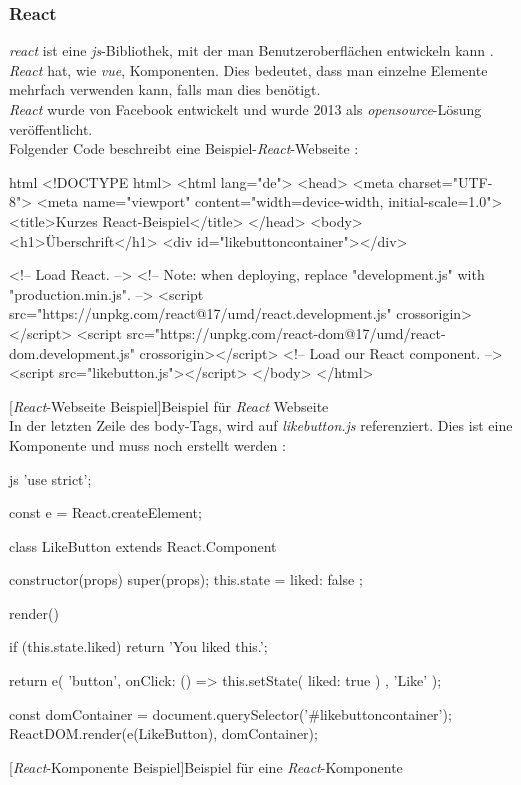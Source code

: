 \subsubsection{React}
\textit{\Gls{react}} ist eine \textit{\Gls{js}}-Bibliothek, mit der man Benutzeroberflächen entwickeln kann \cite{reactdoc}. \textit{React} hat, wie \textit{\Gls{vue}}, Komponenten. Dies bedeutet, dass man einzelne Elemente mehrfach verwenden kann, falls man dies benötigt.\\
\textit{React} wurde von Facebook entwickelt und wurde 2013 als \textit{\Gls{opensource}}-Lösung veröffentlicht.\\
Folgender Code beschreibt eine Beispiel-\textit{React}-Webseite \cite{reactdoc}:
\begin{code}{html}
	<!DOCTYPE html>
	<html lang="de">
		<head>
			<meta charset="UTF-8">
			<meta name="viewport" content="width=device-width, initial-scale=1.0">
			<title>Kurzes React-Beispiel</title>
		</head>
		<body>
			<h1>Überschrift</h1>
			<div id="likebuttoncontainer"></div>
			
			<!-- Load React. -->
			<!-- Note: when deploying, replace "development.js" with "production.min.js". -->
			<script src="https://unpkg.com/react@17/umd/react.development.js" crossorigin></script>
			<script src="https://unpkg.com/react-dom@17/umd/react-dom.development.js" crossorigin></script>
			<!-- Load our React component. -->
			<script src="likebutton.js"></script>
		</body>
	</html>
\end{code}
[\textit{React}-Webseite Beispiel]{Beispiel für \textit{React} Webseite}~\\
\newpage
In der letzten Zeile des body-Tags, wird auf \textit{likebutton.js} referenziert. Dies ist eine Komponente und muss noch erstellt werden \cite{reactdoc}:
\begin{code}{js}
	'use strict';
	
	const e = React.createElement;
	
	class LikeButton extends React.Component {
		constructor(props) {
			super(props);
			this.state = { liked: false };
		}
		
		render() {
			if (this.state.liked) {
				return 'You liked this.';
			}
			
			return e(
			'button',
			{ onClick: () => this.setState({ liked: true }) },
			'Like'
			);
		}
	}
	
	const domContainer = document.querySelector('#likebuttoncontainer');
	ReactDOM.render(e(LikeButton), domContainer);
\end{code}
[\textit{React}-Komponente Beispiel]{Beispiel für eine \textit{React}-Komponente}
\newpage
